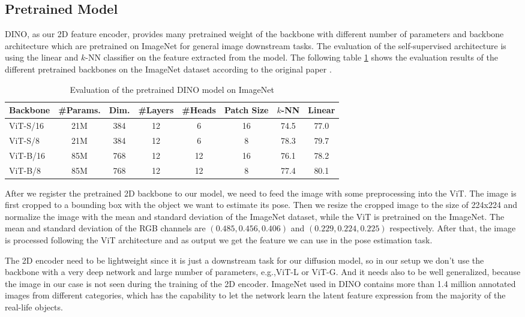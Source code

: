 \documentclass[12pt,DIV14,BCOR12mm,a4paper,footinclude=false,headinclude,parskip=half-,twoside,openright,cleardoublepage=empty,toc=index,bibliography=totoc,listof=totoc]{scrreprt}
\numberwithin{equation}{chapter}
\begin{document}
\subsection{Pretrained Model} 
DINO, as our 2D feature encoder, provides many pretrained weight of the backbone with different number of parameters and backbone architecture which are pretrained on ImageNet for general image downstream tasks. The evaluation of the self-supervised architecture is using the linear and $k$-NN classifier on the feature extracted from the model. The following table \ref{tab:dino} shows the evaluation results of the different pretrained backbones on the ImageNet dataset according to the original paper \cite{caron2021emerging}.
\begin{table}[ht]
  \centering
  \caption{Evaluation of the pretrained DINO model on ImageNet}
  \label{tab:dino}
  \begin{tabular}{l | c c c c c c c}
      \toprule
      Backbone & \#Params. & Dim. & \#Layers & \#Heads & Patch Size & $k$-NN & Linear\\
      \midrule
      ViT-S/16 & 21M & 384 & 12 & 6 & 16 & 74.5 & 77.0 \\
      ViT-S/8 & 21M & 384 & 12 & 6 & 8 & 78.3 & 79.7 \\
      ViT-B/16 & 85M & 768 & 12 & 12 & 16 & 76.1 & 78.2 \\
      ViT-B/8 & 85M & 768 & 12 & 12 & 8 & 77.4 & 80.1 \\
      \bottomrule
  \end{tabular}
\end{table}

After we register the pretrained 2D backbone to our model, we need to feed the image with some preprocessing into the ViT. The image is first cropped to a bounding box with the object we want to estimate its pose. Then we resize the cropped image to the size of 224x224 and normalize the image with the mean and standard deviation of the ImageNet dataset, while the ViT is pretrained on the ImageNet. The mean and standard deviation of the RGB channels are $(0.485, 0.456, 0.406)$ and $(0.229, 0.224, 0.225)$ respectively. After that, the image is processed following the ViT architecture and as output we get the feature we can use in the pose estimation task. 

The 2D encoder need to be lightweight since it is just a downstream task for our diffusion model, so in our setup we don't use the backbone with a very deep network and large number of parameters, e.g.,ViT-L or ViT-G. And it needs also to be well generalized, because the image in our case is not seen during the training of the 2D encoder. ImageNet used in DINO contains more than 1.4 million annotated images from different categories, which has the capability to let the network learn the latent feature expression from the majority of the real-life objects. 
\end{document}
